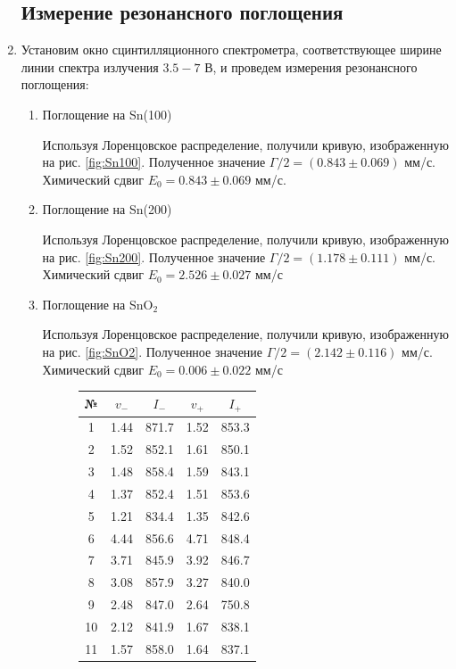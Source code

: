 \documentclass[a4paper, 12pt]{article}
\begin{document}
\begin{enumerate}
		\subsection{Измерение резонансного поглощения}
		\item Установим окно сцинтилляционного спектрометра, соответствующее ширине линии спектра излучения $3.5-7$ В, и проведем измерения резонансного поглощения:
		\begin{enumerate}
			\item Поглощение на Sn(100)\par
				Используя Лоренцовское распределение, получили кривую, изображенную на рис. \ref{fig:Sn100}. Полученное значение $\Gamma/2=(0.843\pm 0.069)$ мм/с. Химический сдвиг $E_0=0.843 \pm 0.069$ мм/с.
			\item Поглощение на Sn(200)\par
				Используя Лоренцовское распределение, получили кривую, изображенную на рис. \ref{fig:Sn200}. Полученное значение $\Gamma/2=(1.178\pm 0.111)$ мм/с. Химический сдвиг $E_0=2.526 \pm 0.027$ мм/с
			\item Поглощение на SnO$_2$\par
				Используя Лоренцовское распределение, получили кривую, изображенную на рис. \ref{fig:SnO2}. Полученное значение $\Gamma/2=(2.142\pm 0.116)$ мм/с. Химический сдвиг $E_0=0.006 \pm 0.022$ мм/с
			\begin{figure}[h]
			\begin{minipage}{0.49\textwidth}
				\begin{tabular}{|c|c|c|c|c|}
					\hline
					№ & $v_-$ & $I_-$ & $v_+$ & $I_+$\\
					\hline
					1 & 1.44 & 871.7 & 1.52 & 853.3 \\
 					2 & 1.52 & 852.1 & 1.61 & 850.1 \\
				 	3 & 1.48 & 858.4 & 1.59 & 843.1 \\
 					4 & 1.37 & 852.4 & 1.51 & 853.6 \\
 					5 & 1.21 & 834.4 & 1.35 & 842.6 \\
 					6 & 4.44 & 856.6 & 4.71 & 848.4 \\
 					7 & 3.71 & 845.9 & 3.92 & 846.7 \\
 					8 & 3.08 & 857.9 & 3.27 & 840.0 \\
 					9 & 2.48 & 847.0 & 2.64 & 750.8 \\
 					10 & 2.12 & 841.9 & 1.67 & 838.1 \\
 					11 & 1.57 & 858.0 & 1.64 & 837.1 \\

\end{tabular}
\end{minipage}
\end{figure}
\end{enumerate}
\end{enumerate}
\end{document}

